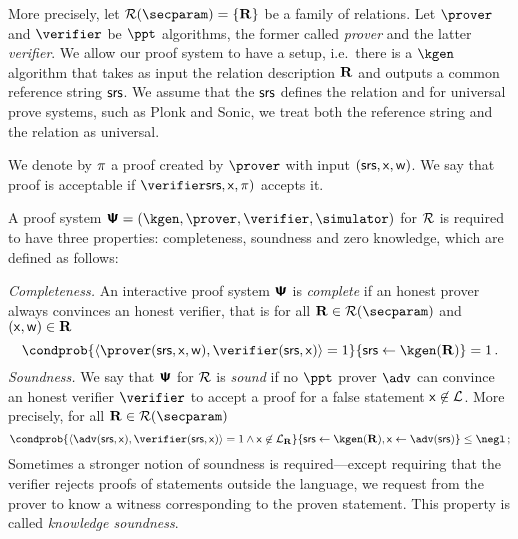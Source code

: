 \documentclass[runningheads,11pt]{llncs}
\newcommand{\ourpar}[1] {\smallskip\noindent\emph{#1}}
\begin{document}
More precisely, let $\RELGEN(\secparam) = \smallset{\REL}$ be a family of 
relations. Let $\prover$ and $\verifier$ be $\ppt$ algorithms, the former called \emph{prover}
and the latter \emph{verifier}. We allow our proof system to have a setup, i.e.~there is a
$\kgen$ algorithm that takes as input the relation description $\mathbf{R}$ and outputs a common
reference string $\mathsf{srs}$. We assume that the $\mathsf{srs}$ defines the relation and for universal prove
systems, such as Plonk and Sonic, we treat both the reference string and the relation as
universal.

We denote by $\pi$ a proof created by $\prover$ with input
$(\mathsf{srs}, \mathsf{x}, \mathsf{w})$. We say that proof is acceptable if $\verifier \srs, \inp, \zkproof)$ accepts it. 

A proof system $\proofsystem = (\kgen, \prover, \verifier, \simulator)$ for $\mathcal{R}$ is
required to have three properties: completeness, soundness and zero knowledge, which are
defined as follows:

\ourpar{Completeness.}
An interactive proof system $\bm{\mathsf{\Psi}}$ is \emph{complete} if an honest prover always
convinces an honest verifier, that is for all $\REL \in \RELGEN(\secparam)$ and
$(\mathsf{x}, \mathsf{w}) \in \mathbf{R}$
	\[
		\condprob{\ip{\prover (\srs, \inp, \wit)}{\verifier (\srs,
        \inp)} = 1}{\srs \gets \kgen(\REL)} = 1\,.
	\]
\ourpar{Soundness.}
    We say that $\bm{\mathsf{\Psi}}$ for $\mathcal{R}$ is \emph{sound} if no
  $\ppt$ prover $\adv$ can convince an honest verifier $\verifier$ to accept a
  proof for a false statement $\mathsf{x} \not\in\mathcal{L}$. More precisely, for
  all $\REL \in \RELGEN(\secparam)$
	\[
    \condprob{\ip{\adv(\srs, \inp)}{\verifier(\srs, \inp)} = 1 \land \inp
      \not\in \LANG_\REL}{\srs \gets \kgen(\REL), \inp \gets \adv(\srs)} \leq
    \negl\,;
	\]
Sometimes a stronger notion of soundness is required---except requiring that the
verifier rejects proofs of statements outside the language, we request from the
prover to know a witness corresponding to the proven statement. This property is
called \emph{knowledge soundness}.%
\end{document}
